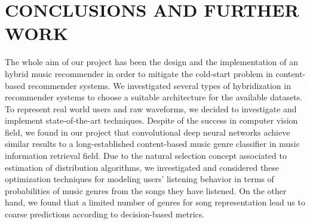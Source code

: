 \documentclass{article}
\begin{document}



%
%
%

\section{CONCLUSIONS AND FURTHER WORK}
\label{sec:refs}
The whole aim of our project has been the design and the implementation of an hybrid music recommender in order to mitigate the cold-start problem in content-based recommender systems. We investigated several types of hybridization in recommender systems to choose a suitable architecture for the available datasets. To represent real world users and raw waveforms, we decided to investigate and implement state-of-the-art techniques. Despite of the success in computer vision field, we found in our project that convolutional deep neural networks achieve similar results to a long-established content-based music genre classifier in music information retrieval field. Due to the natural selection concept associated to estimation of distribution algorithms, we investigated and considered these optimization techniques for modeling users' listening behavior in terms of probabilities of music genres from the songs they have listened. On the other hand, we found that a limited number of genres for song representation lead us to coarse predictions according to decision-based metrics.
\end{document}
